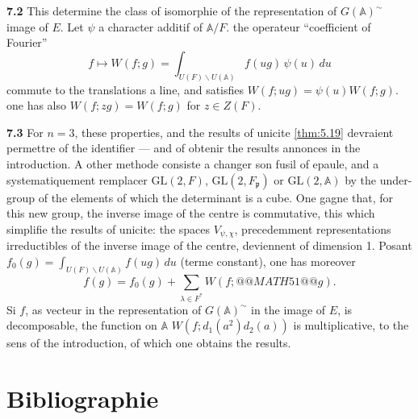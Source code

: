 \documentclass[12pt,a4paper]{article}
\theoremstyle{plain}
\theoremstyle{definition}
\theoremstyle{remark}
\newcommand{\Af}{\mathbb{A}}
\newcommand{\frakp}{\mathfrak{p}}
\providecommand{\frakp}{\mathfrak{p}}
\begin{document}
\textbf{7.2} This determine the class of isomorphie of the representation of $G(\Af)^\sim$ image of $E$. Let $\psi$ a character additif of $\Af/F$. the operateur ``coefficient of Fourier''
\[
f \longmapsto W(f; g) = \int_{U(F) \backslash U(\Af)} f(ug) \, \psi(u) \, du
\]
commute to the translations a line, and satisfies $W(f; ug) = \psi(u) W(f; g)$. one has also $W(f; zg) = W(f; g)$ for $z \in Z(F)$.

\textbf{7.3} For $n = 3$, these properties, and the results of unicite \ref{thm:5.19} devraient permettre of the identifier --- and of obtenir the results annonces in the introduction. A other methode consiste a changer son fusil of epaule, and a systematiquement remplacer $\mathrm{GL}(2, F)$, $\mathrm{GL}(2, F_\frakp)$ or $\mathrm{GL}(2, \Af)$ by the under-group of the elements of which the determinant is a cube. One gagne that, for this new group, the inverse image of the centre is commutative, this which simplifie the results of unicite: the spaces $V_{\psi, \chi}$, precedemment representations irreductibles of the inverse image of the centre, deviennent of dimension 1. Posant $f_0(g) = \int_{U(F) \backslash U(\Af)} f(ug) \, du$ (terme constant), one has moreover
\[
f(g) = f_0(g) + \sum_{\lambda \in F^*} W(f; @@MATH51@@ g).
\]
Si $f$, as vecteur in the representation of $G(\Af)^\sim$ in the image of $E$, is decomposable, the function on $\Af$ $W(f; d_1(a^2) d_2(a))$ is multiplicative, to the sens of the introduction, of which one obtains the results.

\section*{Bibliographie}
\end{document}

